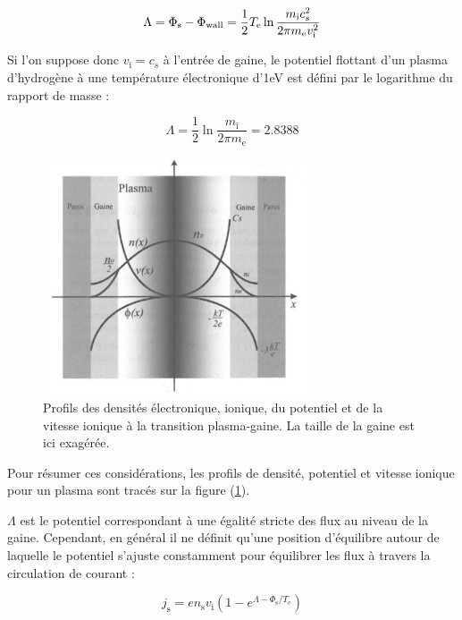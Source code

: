 \begin{refsection}
\begin{equation}
	\Lambda=\Phi_\text{s}-\Phi_\text{wall}=\frac{1}{2}T_\text{e}\ln{\frac{m_\text{i}c_{s}^2}{2\pi
	m_\text{e}v_\text{i}^{{2}}}}
	\end{equation}

Si l'on suppose donc $v_\text{i}=c_{s}$ à l'entrée de gaine, le potentiel
flottant d'un plasma d'hydrogène à une température électronique d'1eV est
défini par le logarithme du rapport de masse :

\begin{equation}
	\Lambda=\frac{1}{2}\ln{\frac{m_\text{i}}{2\pi
	m_\text{e}}}=2.8388
	\end{equation}
	
\begin{figure}[htbp]
\centering
\includegraphics[height=70mm,width=80mm]{figures/1-sheathprofiles.jpg}{\caption{Profils
des densités électronique, ionique,
du potentiel et de la vitesse ionique à
la transition plasma-gaine\parencite{Rax}. La taille
de la gaine est ici exagérée.}\label{1-profilesgaine}}
\end{figure}

Pour résumer ces considérations, les profils de densité,
potentiel et vitesse ionique pour un plasma sont tracés sur la figure
(\ref{1-profilesgaine}).

$\Lambda$ est le potentiel correspondant à une égalité stricte des flux au
niveau de la gaine. Cependant, en général il ne définit qu'une position
d'équilibre autour de laquelle le potentiel s'ajuste constamment pour
équilibrer les flux à travers la circulation de courant :

\begin{equation}
	j_\text{s}=en_\text{s}v_\text{i}\left(1-e^{\Lambda-\Phi_\text{s}/T_\text{e}}\right)
\end{equation}


\end{refsection}
